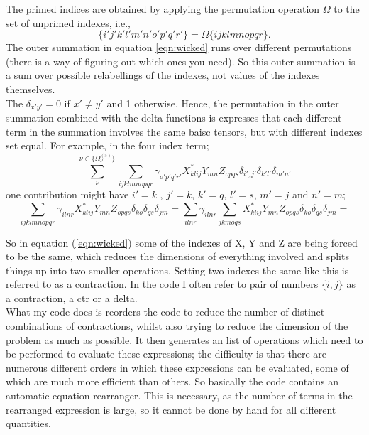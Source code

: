 \documentclass[12pt]{article}
\begin{document}
The primed indices are obtained by applying the permutation operation
$\Omega$ to the set of unprimed indexes, i.e.,
\begin{equation}
 \{i'j'k'l'm'n'o'p'q'r'\} = \Omega\{ijklmnopqr\}.
\end{equation}
The outer summation in equation \ref{eqn:wicked} runs over different permutations (there is a way of figuring out
which ones you need). So this outer summation is a sum over possible relabellings of the indexes,
not values of the indexes themselves.\\

The $\delta_{x'y'}=  0$ if $x'\neq y'$ and 1 otherwise.  Hence, the permutation in the outer summation
combined with the delta functions is expresses that each different term in the summation involves
the same baisc tensors, but with different indexes set equal.
For example, in the four index term;
\begin{equation}
\sum_{\nu}^{ \nu \in \{\Omega^{(5)}_{\nu}\}}
\sum_{ijklmnopqr}
\gamma_{o'p'q'r'}
X^{*}_{klij}Y_{mn}Z_{opqs}\delta_{i',j'}\delta_{k'l'}\delta_{m'n'}
\end{equation}
one contribution might have $i'=k$ , $j'=k$, $k'=q$, $l'=s$, $m'=j$ and $n'=m$;
\begin{equation}
\sum_{ijklmnopqr}
\gamma_{ilnr}
X^{*}_{klij}Y_{mn}Z_{opqs}\delta_{ko}\delta_{qs}\delta_{jm}= 
\sum_{ilnr}
\gamma_{ilnr}
\sum_{jkmoqs}
X^{*}_{klij}Y_{mn}Z_{opqs}\delta_{ko}\delta_{qs}\delta_{jm}= 
\end{equation}

So in equation (\ref{eqn:wicked}) some of the indexes of X, Y and Z are being
forced to be the same, which reduces the dimensions of everything involved and
splits things up into two smaller operations.
Setting two indexes the same like this is referred to as a contraction. In the code
I often refer to pair of numbers $\{i,j\}$ as a contraction, a ctr or a delta.\\

What my code does is reorders the code to reduce the number of distinct combinations of contractions,
whilst also trying to reduce the dimension of the problem as much as possible. It then
generates an list of operations which need to be performed to evaluate these
expressions; the difficulty is that there are numerous different orders in
which these expressions can be evaluated, some of which are much more efficient
than others. So basically the code contains an automatic equation rearranger. 
This is necessary, as the number of terms in the rearranged expression is large,
so it cannot be done by hand for all different quantities.\\
\end{document}

